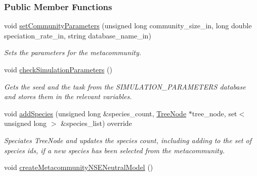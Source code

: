 \subsubsection*{Public Member Functions}
\begin{DoxyCompactItemize}
\item 
void \hyperlink{group___community_objects_af9407da2a2e99848ac11ce3a426d4c8a}{set\+Community\+Parameters} (unsigned long community\+\_\+size\+\_\+in, long double speciation\+\_\+rate\+\_\+in, string database\+\_\+name\+\_\+in)
\begin{DoxyCompactList}\small\item\em Sets the parameters for the metacommunity. \end{DoxyCompactList}\item 
void \hyperlink{group___community_objects_ad3775b6cecab860b008d15cc9c7650ea}{check\+Simulation\+Parameters} ()
\begin{DoxyCompactList}\small\item\em Gets the seed and the task from the S\+I\+M\+U\+L\+A\+T\+I\+O\+N\+\_\+\+P\+A\+R\+A\+M\+E\+T\+E\+RS database and stores them in the relevant variables. \end{DoxyCompactList}\item 
void \hyperlink{group___community_objects_a8cad1a5648ff5b6b51f2441898fdad48}{add\+Species} (unsigned long \&species\+\_\+count, \hyperlink{class_tree_node}{Tree\+Node} $\ast$tree\+\_\+node, set$<$ unsigned long $>$ \&species\+\_\+list) override
\begin{DoxyCompactList}\small\item\em Speciates Tree\+Node and updates the species count, including adding to the set of species ids, if a new species has been selected from the metacommunity. \end{DoxyCompactList}\item 
void \hyperlink{group___community_objects_a2557f1dc48f4a7aba97431ac8a8c7dbd}{create\+Metacommunity\+N\+S\+E\+Neutral\+Model} ()\hypertarget{group___community_objects_a2557f1dc48f4a7aba97431ac8a8c7dbd}{}\label{group___community_objects_a2557f1dc48f4a7aba97431ac8a8c7dbd}


\end{DoxyCompactItemize}
